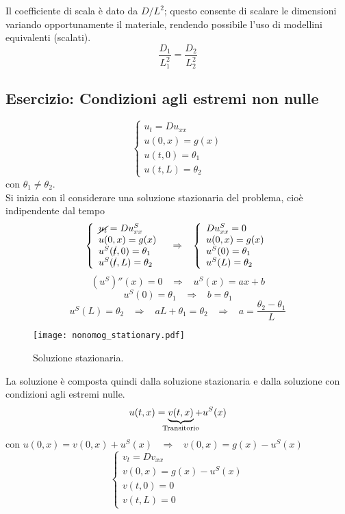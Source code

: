 Il coefficiente di scala \`e dato da $D/L^2$; questo consente di 
scalare le dimensioni variando opportunamente il materiale, rendendo possibile
l'uso di modellini equivalenti (scalati).
\[
	\frac{D_1}{L_1^2}= \frac{D_2}{L_2^2}
\]
\subsection{Esercizio: Condizioni agli estremi non nulle}
\[
	\left\{
	\begin{array}{l}
		u_t=Du_{xx} \\
		u(0,x)=g(x) \\
		u(t,0)=\theta_1 \\
		u(t,L)=\theta_2
	\end{array}
	\right.
\]
con $\theta_1 \neq \theta_2$.\\
Si inizia con il considerare una soluzione stazionaria del problema, cio\`e
indipendente dal tempo
\[
	\left\{
	\begin{array}{l}
		\cancel{u_t}=Du_{xx}^S \\
		u(0,x)=g(x) \\
		u^S(\cancel{t},0)=\theta_1 \\
		u^S(\cancel{t},L)=\theta_2
	\end{array}
	\right.
	\;\;\;
	\Rightarrow
	\;\;\;
	\left\{
	\begin{array}{l}
		Du_{xx}^S= 0 \\
		u(0,x)=g(x) \\
		u^S(0)=\theta_1 \\
		u^S(L)=\theta_2
	\end{array}
	\right.
\]
\[
	(u^S)''(x)=0 \;\;\; \Rightarrow \;\;\; u^S(x)=ax+b
\]
\[
	u^S(0)= \theta_1 \;\;\; \Rightarrow \;\;\; b= \theta_1
\]
\[
	u^S(L)= \theta_2 \;\;\; \Rightarrow \;\;\; aL+\theta_1= \theta_2
	\;\;\; \Rightarrow \; \; \; a= \frac{\theta_2 - \theta_1}{L}
\]
\begin{figure}[H]
	\centering
	\texttt{[image: nonomog\_stationary.pdf]}
	\caption{Soluzione stazionaria.}
	\label{nonomog_stationary}
\end{figure}
La soluzione \`e composta quindi dalla soluzione stazionaria e dalla soluzione
con condizioni agli estremi nulle.
\[
	u(t,x)= \underbrace{v(t,x)}_{\mathclap{\text{Transitorio}}} + u^S(x)
\]
con $u(0,x)= v(0,x) + u^S(x) \;\;\; \Rightarrow \;\;\; v(0,x)=g(x)- u^S(x)$
\[
	\left\{
	\begin{array}{l}
		v_t=Dv_{xx} \\
		v(0,x)=g(x)- u^S(x) \\
		v(t,0)=0 \\
		v(t,L)=0
	\end{array}
	\right.
\] 
